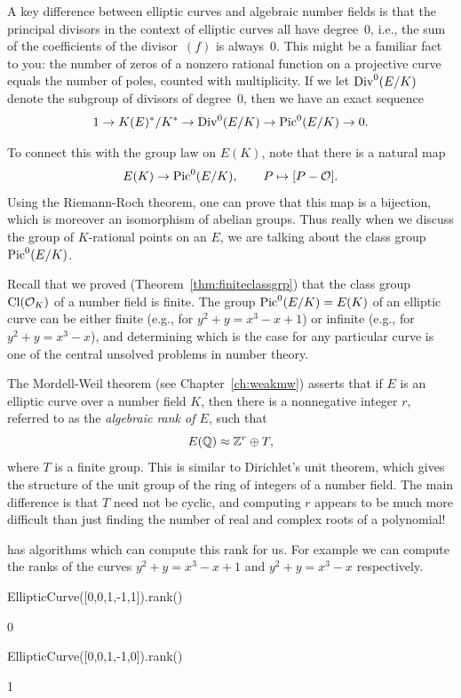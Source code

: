 A key difference between elliptic curves and algebraic number fields
is that the principal divisors in the context of elliptic curves all
have degree~$0$, i.e., the sum of the coefficients of the
divisor~$(f)$ is always~$0$.  This might be a familiar fact to you:
the number of zeros of a nonzero rational function on a projective
curve equals the number of poles, counted with multiplicity.  If we
let $\operatorname{Div}^0(E/K)$ denote the subgroup of divisors of degree~$0$, then
we have an exact sequence
$$
  1\to K(E)^*/K^* \to \operatorname{Div}^0(E/K) \to \operatorname{Pic}^0(E/K) \to 0.
$$

To connect this with the group law on $E(K)$, note that there
is a natural map
$$
 E(K) \to \operatorname{Pic}^0(E/K), \qquad P \mapsto [P-\mathcal{O}].
$$
Using the Riemann-Roch theorem, one can prove that this map
is a bijection, which is moreover an isomorphism of abelian groups.
Thus really when we discuss the group of $K$-rational
points on an $E$, we are talking
about the class group $\operatorname{Pic}^0(E/K)$.

Recall that we proved (Theorem~\ref{thm:finiteclassgrp}) that the
class group $\operatorname{Cl}(\mathcal{O}_K)$ of a number field is finite.
The  group $\operatorname{Pic}^0(E/K) =E(K)$ of an elliptic curve can be
either finite (e.g., for $y^2 + y = x^3 - x + 1$) or infinite (e.g.,
for $y^2 + y = x^3 - x$), and determining which is the case for any particular
curve is one of the central unsolved problems in number theory.

The Mordell-Weil theorem (see Chapter~\ref{ch:weakmw}) asserts that if $E$ is
an elliptic curve over a number field $K$, then there is a nonnegative integer
$r$, referred to as the \emph{algebraic rank of $E$}, such that
\begin{equation}\label{eqn:mw}
  E(\mathbb{Q}) \approx \mathbb{Z}^r \oplus T,
\end{equation}
where $T$ is a finite group.   This is similar to Dirichlet's unit theorem, which
gives the structure of the unit group of the ring of integers of a number field.
The main difference is that $T$ need not be cyclic, and computing $r$ appears to be
much more difficult than just finding the number of real and complex roots of
a polynomial!

\begin{example}
\sage has algorithms which can compute this rank for us.
For example we can compute the ranks of the curves
$y^2 + y = x^3 - x + 1$ and $y^2 + y = x^3 - x$ respectively.
\begin{sagecode}
\begin{sagecell}
EllipticCurve([0,0,1,-1,1]).rank()
\end{sagecell}
\begin{sageout}
0
\end{sageout}
\begin{sagecell}
EllipticCurve([0,0,1,-1,0]).rank()
\end{sagecell}
\begin{sageout}
1
\end{sageout}
\end{sagecode}
\end{example}

